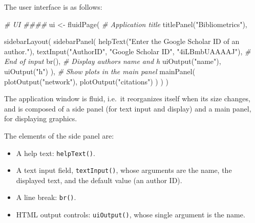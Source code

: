 \documentclass[
  12pt,
  american,
  a4paper,
  extrafontsizes,onecolumn,openright
  ]{memoir}
\newenvironment{Shaded}{\begin{snugshade}}{\end{snugshade}}
\newcommand{\CommentTok}[1]{\textcolor[rgb]{0.56,0.35,0.01}{\textit{#1}}}
\newcommand{\FunctionTok}[1]{\textcolor[rgb]{0.00,0.00,0.00}{#1}}
\newcommand{\NormalTok}[1]{#1}
\newcommand{\OtherTok}[1]{\textcolor[rgb]{0.56,0.35,0.01}{#1}}
\newcommand{\StringTok}[1]{\textcolor[rgb]{0.31,0.60,0.02}{#1}}
\providecommand{\tightlist}{%
  \setlength{\itemsep}{0pt}\setlength{\parskip}{0pt}}
\newlength{\rf}
\begin{document}
The user interface is as follows:

\scriptsize

\begin{Shaded}
\begin{Highlighting}[]
\CommentTok{\# UI \#\#\#\#}
\NormalTok{ui }\OtherTok{\textless{}{-}} \FunctionTok{fluidPage}\NormalTok{(}
  \CommentTok{\# Application title}
  \FunctionTok{titlePanel}\NormalTok{(}\StringTok{"Bibliometrics"}\NormalTok{),}
  
  \FunctionTok{sidebarLayout}\NormalTok{(}
    \FunctionTok{sidebarPanel}\NormalTok{(}
      \FunctionTok{helpText}\NormalTok{(}\StringTok{"Enter the Google Scholar ID of an author."}\NormalTok{),}
      \FunctionTok{textInput}\NormalTok{(}\StringTok{"AuthorID"}\NormalTok{, }\StringTok{"Google Scholar ID"}\NormalTok{, }\StringTok{"4iLBmbUAAAAJ"}\NormalTok{),}
      \CommentTok{\# End of input}
      \FunctionTok{br}\NormalTok{(),}
      \CommentTok{\# Display author\textquotesingle{}s name and h}
      \FunctionTok{uiOutput}\NormalTok{(}\StringTok{"name"}\NormalTok{),}
      \FunctionTok{uiOutput}\NormalTok{(}\StringTok{"h"}\NormalTok{)}
\NormalTok{    ),}
    \CommentTok{\# Show plots in the main panel}
    \FunctionTok{mainPanel}\NormalTok{(}
      \FunctionTok{plotOutput}\NormalTok{(}\StringTok{"network"}\NormalTok{),}
      \FunctionTok{plotOutput}\NormalTok{(}\StringTok{"citations"}\NormalTok{)}
\NormalTok{    )}
\NormalTok{  )}
\NormalTok{)}
\end{Highlighting}
\end{Shaded}

\normalsize

The application window is fluid, i.e.~it reorganizes itself when its size changes, and is composed of a side panel (for text input and display) and a main panel, for displaying graphics.

The elements of the side panel are:

\begin{itemize}
\tightlist
\item
  A help text: \texttt{helpText()}.
\item
  A text input field, \texttt{textInput()}, whose arguments are the name, the displayed text, and the default value (an author ID).
\item
  A line break: \texttt{br()}.
\item
  HTML output controls: \texttt{uiOutput()}, whose single argument is the name.
\end{itemize}
\end{document}
